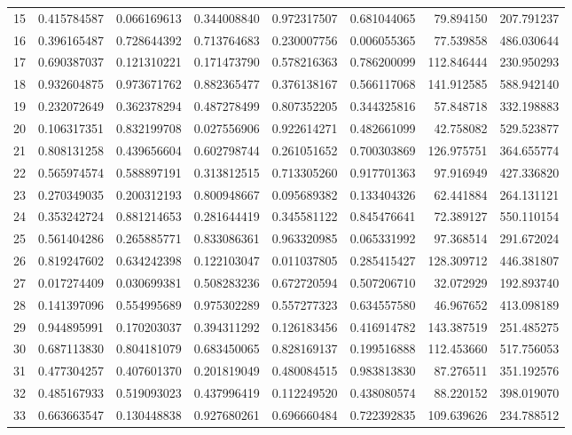 \begin{longtable}{rrrrrrrr}
15 & 0.415784587 & 0.066169613 & 0.344008840 & 0.972317507 & 0.681044065 & 79.894150 & 207.791237 \\
16 & 0.396165487 & 0.728644392 & 0.713764683 & 0.230007756 & 0.006055365 & 77.539858 & 486.030644 \\
17 & 0.690387037 & 0.121310221 & 0.171473790 & 0.578216363 & 0.786200099 & 112.846444 & 230.950293 \\
18 & 0.932604875 & 0.973671762 & 0.882365477 & 0.376138167 & 0.566117068 & 141.912585 & 588.942140 \\
19 & 0.232072649 & 0.362378294 & 0.487278499 & 0.807352205 & 0.344325816 & 57.848718 & 332.198883 \\
20 & 0.106317351 & 0.832199708 & 0.027556906 & 0.922614271 & 0.482661099 & 42.758082 & 529.523877 \\
21 & 0.808131258 & 0.439656604 & 0.602798744 & 0.261051652 & 0.700303869 & 126.975751 & 364.655774 \\
22 & 0.565974574 & 0.588897191 & 0.313812515 & 0.713305260 & 0.917701363 & 97.916949 & 427.336820 \\
23 & 0.270349035 & 0.200312193 & 0.800948667 & 0.095689382 & 0.133404326 & 62.441884 & 264.131121 \\
24 & 0.353242724 & 0.881214653 & 0.281644419 & 0.345581122 & 0.845476641 & 72.389127 & 550.110154 \\
25 & 0.561404286 & 0.265885771 & 0.833086361 & 0.963320985 & 0.065331992 & 97.368514 & 291.672024 \\
26 & 0.819247602 & 0.634242398 & 0.122103047 & 0.011037805 & 0.285415427 & 128.309712 & 446.381807 \\
27 & 0.017274409 & 0.030699381 & 0.508283236 & 0.672720594 & 0.507206710 & 32.072929 & 192.893740 \\
28 & 0.141397096 & 0.554995689 & 0.975302289 & 0.557277323 & 0.634557580 & 46.967652 & 413.098189 \\
29 & 0.944895991 & 0.170203037 & 0.394311292 & 0.126183456 & 0.416914782 & 143.387519 & 251.485275 \\
30 & 0.687113830 & 0.804181079 & 0.683450065 & 0.828169137 & 0.199516888 & 112.453660 & 517.756053 \\
31 & 0.477304257 & 0.407601370 & 0.201819049 & 0.480084515 & 0.983813830 & 87.276511 & 351.192576 \\
32 & 0.485167933 & 0.519093023 & 0.437996419 & 0.112249520 & 0.438080574 & 88.220152 & 398.019070 \\
33 & 0.663663547 & 0.130448838 & 0.927680261 & 0.696660484 & 0.722392835 & 109.639626 & 234.788512 \\

\end{longtable}
